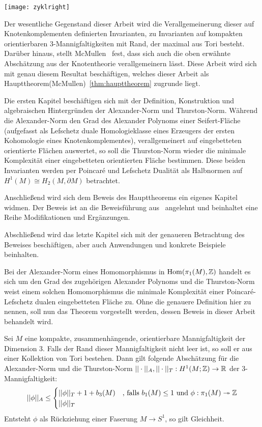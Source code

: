 	\hfill
	\begin{minipage}[t]{0.2\textwidth}
	\vfill \begin{flushright}
		\texttt{[image: zyklright]} 
	\end{flushright}
	\end{minipage}
    
	Der wesentliche Gegenstand dieser Arbeit wird die Verallgemeinerung dieser auf Knotenkomplementen definierten Invarianten, zu Invarianten auf kompakten orientierbaren 3-Mannigfaltigkeiten mit Rand, der maximal aus Tori besteht. Darüber hinaus, stellt McMullen~\cite{MCMULLEN.2002} fest, dass sich auch die oben erwähnte Abschätzung aus der Knotentheorie verallgemeinern lässt. Diese Arbeit wird sich mit genau diesem Resultat beschäftigen, welches dieser Arbeit als Haupttheorem(McMullen)~\ref{thm:haupttheorem} zugrunde liegt.

	Die ersten Kapitel beschäftigen sich mit der Definition, Konstruktion und algebraischen Hintergründen der Alexander-Norm und Thurston-Norm. Während die Alexander-Norm den Grad des Alexander Polynoms einer Seifert-Fläche (aufgefasst als Lefschetz duale Homologieklasse eines Erzeugers der ersten Kohomologie eines Knotenkomplementes), verallgemeinert auf eingebetteten orientierte Flächen auswertet, so soll die Thurston-Norm wieder die minimale Komplexität einer eingebetteten orientierten Fläche bestimmen. Diese beiden Invarianten werden per Poincaré und Lefschetz Dualität als Halbnormen auf $H^1(M) \cong H_2(M,\partial M)$ betrachtet.

	Anschließend wird sich dem Beweis des Haupttheorems ein eigenes Kapitel widmen. Der Beweis ist an die Beweisführung aus~\cite{MCMULLEN.2002} angelehnt und beinhaltet eine Reihe Modifikationen und Ergänzungen. 

	Abschließend wird das letzte Kapitel sich mit der genaueren Betrachtung des Beweises beschäftigen, aber auch Anwendungen und konkrete Beispiele beinhalten.

    Bei der Alexander-Norm eines Homomorphismus in $\operatorname{Hom}(\pi_1(M),\mathbb{Z})$ handelt es sich um den Grad des zugehörigen Alexander Polynoms und die Thurston-Norm weist einem solchen Homomorphismus die minimale Komplexität einer Poincaré-Lefschetz dualen eingebetteten Fläche zu. Ohne die genauere Definition hier zu nennen, soll nun das Theorem vorgestellt werden, dessen Beweis in dieser Arbeit behandelt wird.
    \begin{thm}[McMullen]
    \label{thm:haupttheorem}
    	Sei $M$ eine kompakte, zusammenhängende, orientierbare Mannigfaltigkeit der Dimension 3. Falls der Rand dieser Mannigfaltigkeit nicht leer ist, so soll er aus einer Kollektion von Tori bestehen. Dann gilt folgende Abschätzung für die Alexander-Norm und die Thurston-Norm $||\cdot||_A ,||\cdot||_T : H^1(M;\mathbb{Z}) \to \mathbb{R}$ der 3-Mannigfaltigkeit:
    	\[
    		||\phi||_A \leq 
    		\begin{cases}
    			||\phi||_T + 1+ b_3(M) &\text{, falls } b_1(M)\leq 1 \text{ und } \phi: \pi_1(M) \twoheadrightarrow \mathbb{Z} \\
    			||\phi||_T &
    		\end{cases}
    	\]
    	Entsteht $\phi$ als Rückziehung einer Faserung $M\to S^1$, so gilt Gleichheit.
    \end{thm}